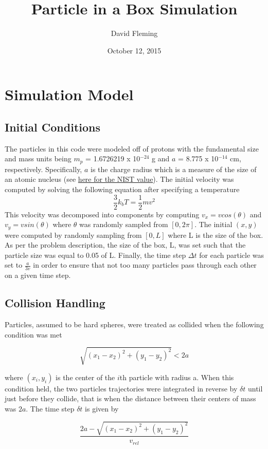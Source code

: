 \documentclass[12pt]{amsart}
\title{Particle in a Box Simulation}
\author{David Fleming}
\date{October 12, 2015} %
\begin{document}
\maketitle

\section{Simulation Model}
\subsection{Initial Conditions}

The particles in this code were modeled off of protons with the fundamental size and mass units being $m_p$ = 1.6726219 x 10$^{-24}$ g and $a$ = 8.775 x 10$^{-14}$ cm, respectively.  Specifically, $a$ is the charge radius which is a measure of the size of an atomic nucleus (see \href{http://physics.nist.gov/cgi-bin/cuu/Value?rp}{here for the NIST value}).  The initial velocity was computed by solving the following equation after specifying a temperature $$ \frac{3}{2} k_b T = \frac{1}{2} m v^2 $$  This velocity was decomposed into components by computing $v_x = vcos(\theta)$ and $v_y = vsin(\theta)$ where $\theta$ was randomly sampled from $[0,2 \pi]$. The initial $(x,y)$  were computed by randomly sampling from $[0,L]$ where L is the size of the box.  As per the problem description, the size of the box, L, was set such that the particle size was equal to 0.05 of L.  Finally, the time step $\Delta t$ for each particle was set to $\frac{a}{3v}$ in order to ensure that not too many particles pass through each other on a given time step.

\subsection{Collision Handling}

Particles, assumed to be hard spheres, were treated as collided when the following condition was met

$$ \sqrt{(x_1 - x_2)^2 + (y_1 - y_2)^2} < 2a  $$ 

where $(x_i,y_i)$ is the center of the $i$th particle with radius a.  When this condition held, the two particles trajectories were integrated in reverse by $\delta t$ until just before they collide, that is when the distance between their centers of mass was $2a$.  The time step $\delta t$ is given by 

$$\frac{2a - \sqrt{(x_1 - x_2)^2 + (y_1 - y_2)^2}}{v_{rel}}  $$ 
\end{document}
